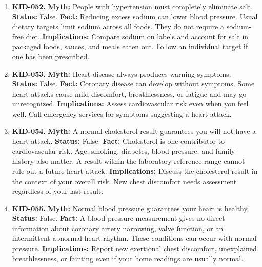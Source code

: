 \documentclass[11pt,oneside]{book}
\begin{document}
\begin{enumerate}[leftmargin=0pt,labelwidth=0pt,labelsep=0pt,itemindent=0pt]
\item[] \textbf{KID-052.} \textbf{Myth:} People with hypertension must completely eliminate salt.\newline
\textbf{Status:} False.\newline
\textbf{Fact:} Reducing excess sodium can lower blood pressure. Usual dietary targets limit sodium across all foods. They do not require a sodium-free diet. \cite{ref272}\newline
\textbf{Implications:} Compare sodium on labels and account for salt in packaged foods, sauces, and meals eaten out. Follow an individual target if one has been prescribed.
\item[] \textbf{KID-053.} \textbf{Myth:} Heart disease always produces warning symptoms.\newline
\textbf{Status:} False.\newline
\textbf{Fact:} Coronary disease can develop without symptoms. Some heart attacks cause mild discomfort, breathlessness, or fatigue and may go unrecognized. \cite{ref46,ref362}\newline
\textbf{Implications:} Assess cardiovascular risk even when you feel well. Call emergency services for symptoms suggesting a heart attack.
\item[] \textbf{KID-054.} \textbf{Myth:} A normal cholesterol result guarantees you will not have a heart attack.\newline
\textbf{Status:} False.\newline
\textbf{Fact:} Cholesterol is one contributor to cardiovascular risk. Age, smoking, diabetes, blood pressure, and family history also matter. A result within the laboratory reference range cannot rule out a future heart attack. \cite{ref46}\newline
\textbf{Implications:} Discuss the cholesterol result in the context of your overall risk. New chest discomfort needs assessment regardless of your last result.
\item[] \textbf{KID-055.} \textbf{Myth:} Normal blood pressure guarantees your heart is healthy.\newline
\textbf{Status:} False.\newline
\textbf{Fact:} A blood pressure measurement gives no direct information about coronary artery narrowing, valve function, or an intermittent abnormal heart rhythm. These conditions can occur with normal pressure. \cite{ref46}\newline
\textbf{Implications:} Report new exertional chest discomfort, unexplained breathlessness, or fainting even if your home readings are usually normal.

\end{enumerate}
\end{document}
